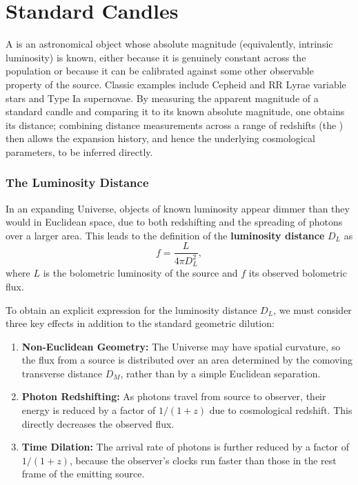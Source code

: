 \vspace{-0.5em}

\section{Standard Candles} \label{sec:standard_candles}

A  is an astronomical object whose absolute magnitude (equivalently, intrinsic luminosity) is known, either because it is genuinely constant across the population or because it can be calibrated against some other observable property of the source. Classic examples include Cepheid and RR Lyrae variable stars and Type Ia supernovae. By measuring the apparent magnitude of a standard candle and comparing it to its known absolute magnitude, one obtains its distance; combining distance measurements across a range of redshifts (the ) then allows the expansion history, and hence the underlying cosmological parameters, to be inferred directly.

\vspace{-0.5em}

\subsubsection{The Luminosity Distance} \label{subsec:luminosity_distance}

In an expanding Universe, objects of known luminosity appear dimmer than they would in Euclidean space, due to both redshifting and the spreading of photons over a larger area. This leads to the definition of the \textbf{luminosity distance} $D_L$ as
$$
f = \frac{L}{4\pi D_L^2} ,
$$
where $L$ is the bolometric luminosity of the source and $f$ its observed bolometric flux. 

To obtain an explicit expression for the luminosity distance $D_L$, we must consider three key effects in addition to the standard geometric dilution:

\begin{enumerate}
    \item \textbf{Non-Euclidean Geometry:} The Universe may have spatial curvature, so the flux from a source is distributed over an area determined by the comoving transverse distance $D_M$, rather than by a simple Euclidean separation.
    \item \textbf{Photon Redshifting:} As photons travel from source to observer, their energy is reduced by a factor of $1/(1+z)$ due to cosmological redshift. This directly decreases the observed flux.
    \item \textbf{Time Dilation:} The arrival rate of photons is further reduced by a factor of $1/(1+z)$, because the observer's clocks run faster than those in the rest frame of the emitting source.
\end{enumerate}

